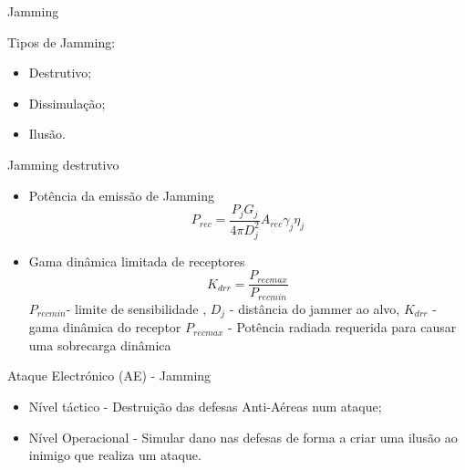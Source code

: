 \documentclass[portuguese,10pt]{beamer}
\begin{document}
\begin{frame}{Jamming}
    
    Tipos de Jamming:
      \vspace*{5mm}
    \begin{itemize}
        \item Destrutivo;
        \vspace*{3mm}
        \item  Dissimulação; 
        \vspace*{3mm}
        \item Ilusão.
    
    \end{itemize}
    
   
\end{frame}



\begin{frame}{Jamming destrutivo }
    
      \vspace*{5mm}
    \begin{itemize}
    \item Potência da emissão de Jamming \begin{equation*}
P_{rec}= \frac{P_j G_j}{4 \pi D_j ^2} A_{rec} \gamma_j \eta_j    
\end{equation*}

\item Gama dinâmica limitada de receptores 
\begin{equation*}
K_{drr}= \frac{P_{rec max}}{P_{rec min}}    
\end{equation*}
$P_{rec min}$- limite de sensibilidade , $D_j$ - distância do jammer ao alvo, $K_{drr}$ - gama dinâmica do receptor  $P_{rec max}$ - Potência radiada requerida para causar uma sobrecarga dinâmica
    \end{itemize}
    
  \end{frame}




\begin{frame}{Ataque Electrónico (AE) - Jamming}\Large
    
    
      \vspace*{5mm}
    \begin{itemize}
        \item Nível táctico - Destruição das defesas Anti-Aéreas num ataque;
        \vspace*{6mm}
        \item  Nível Operacional - Simular dano nas defesas de forma a criar uma ilusão ao inimigo que realiza um ataque.
        \vspace*{3mm}
     
    
    \end{itemize}
    \end{frame}
\end{document}
